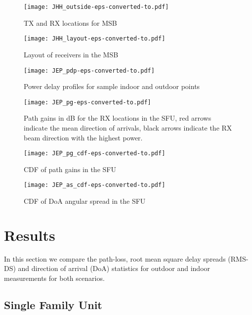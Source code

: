 \documentclass[conference]{IEEEtran}
\begin{document}
\begin{figure}[tbp]
        \centering\texttt{[image: JHH\_outside-eps-converted-to.pdf]}\caption{ TX and RX locations for MSB}\label{fig:JHH_outside}
\end{figure}

\begin{figure}[tbp]
        \centering\texttt{[image: JHH\_layout-eps-converted-to.pdf]}\caption{Layout of receivers in the MSB}\label{fig:JHH_layout}
\end{figure}
 
\begin{figure}[tbp]
        \centering\texttt{[image: JEP\_pdp-eps-converted-to.pdf]}\caption{Power delay profiles for sample indoor and outdoor points}\label{fig:JEP_pdp}
\end{figure}


\begin{figure}[tbp]
        \centering\texttt{[image: JEP\_pg-eps-converted-to.pdf]}\caption{Path gains in dB for the RX locations in the SFU, red arrows indicate the mean direction of arrivals, black arrows indicate the RX beam direction with the highest power. }\label{fig:JEP_pg}
\end{figure}

 \begin{figure}[tbp]
        \centering\texttt{[image: JEP\_pg\_cdf-eps-converted-to.pdf]}\caption{CDF of path gains in the SFU}\label{fig:JEP_pg_cdf}
\end{figure}

\begin{figure}[tbp]
        \centering\texttt{[image: JEP\_as\_cdf-eps-converted-to.pdf]}\caption{CDF of DoA angular spread in the SFU}\label{fig:JEP_as_cdf}
\end{figure}


\section{Results}\label{sec:results}

In this section we compare the path-loss, root mean square delay spreads (RMS-DS) and direction of arrival (DoA) statistics for outdoor and indoor measurements for both scenarios.

\subsection{Single Family Unit}
\end{document}
